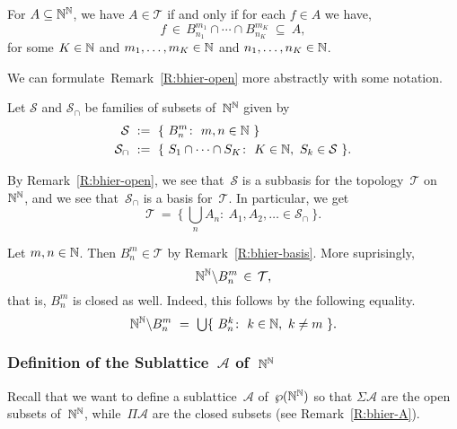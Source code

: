 \documentclass[main.tex]{subfiles}
\begin{document}
\begin{rem}
\label{R:bhier-open}
For $A\subseteq \mathbb{N}^{\mathbb{N}}$,
we have $A\in \mathcal{T}$
if and only if for each $f\in A$
we have,
\begin{equation*}
f\,\in\, B^{m_1}_{n_1} \cap \dotsb \cap B^{m_K}_{n_K} \ \subseteq\ A,
\end{equation*}
for some $K\in\mathbb{N}$ and $m_1,\dotsc,m_K\in\mathbb{N}$
and $n_1,\dotsc,n_K\in\mathbb{N}$.
\end{rem}

We can formulate~Remark~\ref{R:bhier-open} more abstractly
with some notation.
\begin{dfn}
Let $\mathcal{S}$ and $\mathcal{S}_\cap$
be families of subsets of~$\mathbb{N}^{\mathbb{N}}$
given by
\begin{alignat*}{3}
\mathcal{S} \ &\eqdf\  
\{\ B^m_n \colon \ m,n\in\N \ \} \\
\mathcal{S}_\cap \ &\eqdf \ 
\{ \ S_1 \cap \dotsb\cap S_K\colon\ 
K\in\N,\  S_k\in \mathcal{S}\ \}.
\end{alignat*}
\end{dfn}

\begin{rem}\label{R:bhier-basis}
By Remark~\ref{R:bhier-open},
we see that~$\mathcal{S}$
is a subbasis for the topology~$\mathcal{T}$
on~$\mathbb{N}^{\mathbb{N}}$,
and we see that~$\mathcal{S}_\cap$ is a basis
for~$\mathcal{T}$.
In particular, we get
\begin{equation}
\label{eq:expression-t}
\mathcal{T}\ =\ 
\{\ \textstyle{\bigcup_n} A_n\colon \ A_1,A_2,\dotsc \in \mathcal{S}_\cap\ \}.
\end{equation}
\end{rem}
\begin{rem}\label{R:bhier-clopen}
Let $m,n\in\mathbb{N}$. Then  $B^m_n \in \mathcal{T}$ by Remark~\ref{R:bhier-basis}.
More suprisingly,
\begin{equation*}
\mathbb{N}^{\mathbb{N}} \backslash B^m_n\,\in\, \mathcal{T},
\end{equation*}
that is, $B^m_n$ is closed as well.
Indeed, this follows by the following equality.
\begin{equation*}
\N^\N \backslash B^m_n \ =\ 
\textstyle{\bigcup} \{\  B^k_n\colon\ k\in\N,\ k\neq m\ \}.
\end{equation*}

\end{rem}
\subsubsection{Definition of the Sublattice~$\mathcal{A}$ of~$\mathbb{N}^{\mathbb{N}}$}$\,$\\
Recall that we want to define a sublattice~$\mathcal{A}$
of~$\wp(\mathbb{N}^{\mathbb{N}})$
so that $\Sigma \mathcal{A}$
are the open subsets of~$\mathbb{N}^{\mathbb{N}}$,
while~$\Pi \mathcal{A}$  are the closed subsets
(see Remark~\ref{R:bhier-A}).
\end{document}
